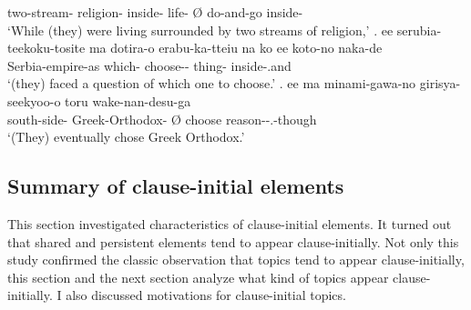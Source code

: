 		 two-stream- religion- inside- life- {\O} do-and-go inside- \\
		`While (they) were living surrounded by two streams of religion,'
 \bg. ee serubia-teekoku-tosite ma dotira-o erabu-ka-tteiu na ko ee koto-no naka-de \\
 	 Serbia-empire-as  which- choose--    thing- inside-.and \\
	`(they) faced a question of which one to choose.'
 \bg. ee ma minami-gawa-no girisya-seekyoo-o \EM{\O} toru wake-nan-desu-ga \\
 	  south-side- Greek-Orthodox- {\O} choose reason--.-though \\
	`(They) eventually chose Greek Orthodox.'


\subsection{Summary of clause-initial elements}

This section investigated characteristics of clause-initial elements.
It turned out that
shared and persistent elements tend to appear clause-initially.
Not only this study confirmed the classic observation that
topics tend to appear clause-initially,
this section and the next section analyze what kind of topics appear clause-initially.
I also discussed motivations for clause-initial topics.


